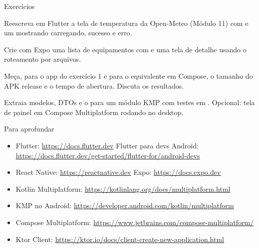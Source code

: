 \documentclass[aspectratio=169,10pt]{beamer}
\begin{document}
\begin{frame}{Exercícios}
  \begin{exercicio}
    Reescreva em Flutter a tela de temperatura da Open-Meteo (Módulo 11) com  e um  mostrando carregando, sucesso e erro.
  \end{exercicio}
  \begin{exercicio}
    Crie com Expo uma lista de equipamentos com  e uma tela de detalhe usando o roteamento por arquivos.
  \end{exercicio}
  \begin{exercicio}
    Meça, para o app do exercício 1 e para o equivalente em Compose, o tamanho do APK release e o tempo de abertura. Discuta os resultados.
  \end{exercicio}
  \begin{projeto}
    Extraia modelos, DTOs e o  para um módulo  KMP com testes em . Opcional: tela de painel em Compose Multiplatform rodando no desktop.
  \end{projeto}
\end{frame}

\begin{frame}{Para aprofundar}
  \small
  \begin{itemize}
    \item Flutter: \url{https://docs.flutter.dev} \quad Flutter para devs Android: \url{https://docs.flutter.dev/get-started/flutter-for/android-devs}
    \item React Native: \url{https://reactnative.dev} \quad Expo: \url{https://docs.expo.dev}
    \item Kotlin Multiplatform: \url{https://kotlinlang.org/docs/multiplatform.html}
    \item KMP no Android: \url{https://developer.android.com/kotlin/multiplatform}
    \item Compose Multiplatform: \url{https://www.jetbrains.com/compose-multiplatform/}
    \item Ktor Client: \url{https://ktor.io/docs/client-create-new-application.html}
  \end{itemize}
\end{frame}
\end{document}
